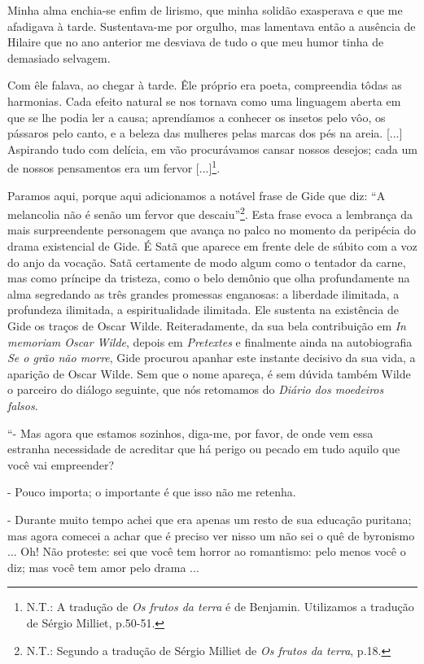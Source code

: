 Minha alma enchia-se enfim de lirismo, que minha solidão exasperava e
que me afadigava à tarde. Sustentava-me por orgulho, mas lamentava então
a ausência de Hilaire que no ano anterior me desviava de tudo o que meu
humor tinha de demasiado selvagem.

Com êle falava, ao chegar à tarde. Êle próprio era poeta, compreendia
tôdas as harmonias. Cada efeito natural se nos tornava como uma
linguagem aberta em que se lhe podia ler a causa; aprendíamos a conhecer
os insetos pelo vôo, os pássaros pelo canto, e a beleza das mulheres
pelas marcas dos pés na areia. {[}...{]} Aspirando tudo com delícia, em
vão procurávamos cansar nossos desejos; cada um de nossos pensamentos
era um fervor {[}...{]}\footnote{N.T.: A tradução de \emph{Os frutos da
  terra} é de Benjamin. Utilizamos a tradução de Sérgio Milliet,
  p.50-51.}.

Paramos aqui, porque aqui adicionamos a notável frase de Gide que diz:
``A melancolia não é senão um fervor que descaiu''\footnote{N.T.:
  Segundo a tradução de Sérgio Milliet de \emph{Os frutos da terra},
  p.18.}. Esta frase evoca a lembrança da mais surpreendente personagem
que avança no palco no momento da peripécia do drama existencial de
Gide. É Satã que aparece em frente dele de súbito com a voz do anjo da
vocação. Satã certamente de modo algum como o tentador da carne, mas
como príncipe da tristeza, como o belo demônio que olha profundamente na
alma segredando as três grandes promessas enganosas: a liberdade
ilimitada, a profundeza ilimitada, a espiritualidade ilimitada. Ele
sustenta na existência de Gide os traços de Oscar Wilde. Reiteradamente,
da sua bela contribuição em \emph{In memoriam Oscar Wilde}, depois em
\emph{Pretextes} e finalmente ainda na autobiografia \emph{Se o grão não
morre}, Gide procurou apanhar este instante decisivo da sua vida, a
aparição de Oscar Wilde. Sem que o nome apareça, é sem dúvida também
Wilde o parceiro do diálogo seguinte, que nós retomamos do \emph{Diário
dos moedeiros falsos}.

``- Mas agora que estamos sozinhos, diga-me, por favor, de onde vem essa
estranha necessidade de acreditar que há perigo ou pecado em tudo aquilo
que você vai empreender?

- Pouco importa; o importante é que isso não me retenha.

- Durante muito tempo achei que era apenas um resto de sua educação
puritana; mas agora comecei a achar que é preciso ver nisso um não sei o
quê de byronismo ... Oh! Não proteste: sei que você tem horror ao
romantismo: pelo menos você o diz; mas você tem amor pelo drama ...

